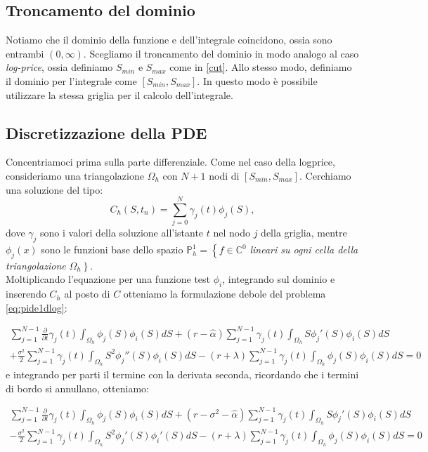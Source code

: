 \documentclass[a4paper,10pt]{report}
\theoremstyle{plain}
\theoremstyle{definition}
\theoremstyle{remark}
\begin{document}
\subsection{Troncamento del dominio}

Notiamo che il dominio della funzione e dell'integrale coincidono, ossia sono entrambi $(0,\infty)$.
Scegliamo il troncamento del dominio in modo analogo al caso \emph{log-price}, ossia definiamo $S_{min}$ e $S_{max}$ come in \eqref{cut}. Allo stesso modo, definiamo il dominio per l'integrale come $[S_{min},S_{max}]$. In questo modo è possibile utilizzare la stessa griglia per il calcolo dell'integrale.

\subsection{Discretizzazione della PDE}
Concentriamoci prima sulla parte differenziale. Come nel caso della logprice, consideriamo una triangolazione $\Omega_h$ con $N+1$ nodi di $[S_{min},S_{max}]$.  Cerchiamo una soluzione del tipo: $$C_h(S,t_n)=\sum_{j=0}^{N}\gamma_j(t)\phi_j(S),$$ dove $\gamma_j$ sono i valori della soluzione all'istante $t$ nel nodo $j$ della griglia, mentre $\phi_j(x)$ sono le funzioni base dello spazio $\mathbb{P}_h^1=\left\{f\in\mathbb{C}^0\right.$ \emph{lineari su ogni cella della triangolazione} $\Omega_h\left.\right\}$.\\
Moltiplicando l'equazione per una funzione test $\phi_i$, integrando sul dominio e inserendo $C_h$ al posto di $C$ otteniamo la formulazione debole del problema \eqref{eq:pide1dlog}:

\begin{multline*}
\sum_{j=1}^{N-1}\frac{\partial}{\partial t}\gamma_j(t)\int_{\Omega_h}\phi_j(S)\phi_i(S)dS+(r-\hat{\alpha})\sum_{j=1}^{N-1}\gamma_j(t)\int_{\Omega_h}S\phi_j'(S)\phi_i(S)dS\\
+\frac{\sigma^2}{2} \sum_{j=1}^{N-1} \gamma_j(t)\int_{\Omega_h} S^2 \phi_j''(S)\phi_i(S)dS -(r+\lambda) \sum_{j=1}^{N-1}\gamma_j(t)\int_{\Omega_h}\phi_j(S)\phi_i(S)dS=0
\end{multline*}
e integrando per parti il termine con la derivata seconda, ricordando che i termini di bordo si annullano, otteniamo:

\begin{multline*}
\sum_{j=1}^{N-1}\frac{\partial}{\partial t}\gamma_j(t)\int_{\Omega_h}\phi_j(S)\phi_i(S)dS
+(r-\sigma^2-\hat{\alpha})\sum_{j=1}^{N-1}\gamma_j(t)\int_{\Omega_h}S\phi_j'(S)\phi_i(S)dS\\
-\frac{\sigma^2}{2}\sum_{j=1}^{N-1} \gamma_j(t)\int_{\Omega_h} S^2\phi_j'(S)\phi_i'(S)dS
-(r+\lambda)\sum_{j=1}^{N-1}\gamma_j(t)\int_{\Omega_h}\phi_j(S)\phi_i(S)dS=0
\end{multline*}
\end{document}
